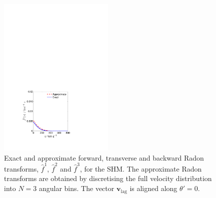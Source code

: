\begin{figure}[ht!]
  \includegraphics[trim={3.5cm 2cm 7.5cm 17cm},clip,width=0.49\textwidth]{Directional/SHM_N3_3.pdf}

\caption[Exact and approximate integrated Radon transforms for $N=3$ components in the SHM]{Exact and approximate forward, transverse and backward Radon transforms, $\hat{f}^1$, $\hat{f}^2$ and $\hat{f}^3$, for the SHM. The approximate Radon transforms are obtained by discretising the full velocity distribution into $N=3$ angular bins. The vector $\textbf{v}_\textrm{lag}$ is aligned along $\theta' = 0$.}
\label{fig:directional:radonN3_SHM}
\end{figure}

